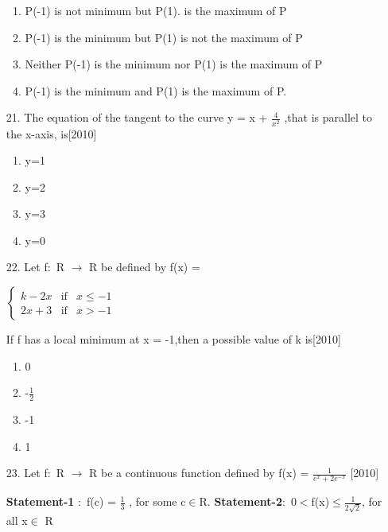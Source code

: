 \documentclass[journal,12pt,twocolumn]{IEEEtran}
\theoremstyle{remark}
\begin{document}
\begin{enumerate}
\begin{enumerate}
        \item P(-1) is not minimum but P(1). is the maximum of P
        \item P(-1) is the minimum but P(1) is not the maximum of P
        \item  Neither P(-1) is the  minimum nor  P(1) is the maximum of P
        \item P(-1) is the minimum and P(1) is the maximum of P.
        \end{enumerate}
        \item[21.] The equation of the tangent to the curve y = x + $\frac{4}{x^2}$ ,that is parallel to the x-axis, is\hfill[2010]
        \begin{enumerate}
            \item y=1
        \item y=2
        \item y=3
        \item y=0
        \end{enumerate}
        \item[22.] Let f$\colon$ R $\to$ R be defined by f(x) = 
    
 $\left\{ \begin{array}{rcl}k-2x & \text{if} &  x\leq -1 \\ 2x+3 & \text{if} & x>-1
     \end{array}\right.$
        
        
        If f has a local minimum at x = -1,then a possible value of k is\hfill[2010]
        
        
        \begin{enumerate}
        \item 0
        \item -$\frac{1}{2}$
        \item -1
        \item 1
        \end{enumerate}
     \item[23.] Let f$\colon$ R $\to$ R be a continuous function defined by f(x) = $\frac{1}{e^x + 2e^{-x}}$ \hfill[2010]
        \begin{enumerate}
            
            \textbf{Statement-1} $\colon$ f(c) = $\frac{1}{3}$ , for some c$\in$R.
            \textbf{Statement-2}$\colon$ 0$<$f(x)$\leq$$\frac{1}{2\sqrt{2}}$, for all x$\in$ R
       
        \end{enumerate}
        

\end{enumerate}
\end{document}
